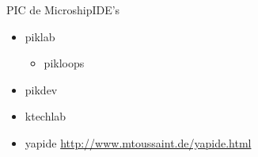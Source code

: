 \documentclass{beamer}
\begin{document}
\begin{frame}{PIC de Microship}{IDE's}
  \begin{itemize}
  \item piklab
    \begin{itemize}
    \item pikloops
    \end{itemize}
  \item pikdev
  \item ktechlab
  \item yapide \url{http://www.mtoussaint.de/yapide.html}
  \end{itemize}
\end{frame}





\end{document}
